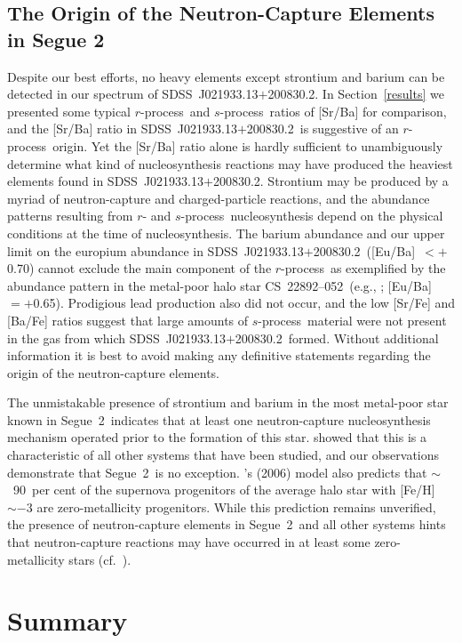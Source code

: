 \documentclass[useAMS,usenatbib,usegraphicx]{mn2e}
\def\rpro{\mbox{$r$-process}}
\def\spro{\mbox{$s$-process}}
\def\seg{\mbox{SDSS~J021933.13$+$200830.2}}
\def\seggal{\mbox{Segue~2}}
\def\cs{\mbox{CS~22892--052}}
\begin{document}
\subsection{The Origin of the Neutron-Capture Elements in Segue 2}
\label{ncaps}


Despite our best efforts, no heavy elements 
except strontium and barium
can be detected in our spectrum of \seg.
In Section~\ref{results}
we presented some typical \rpro\ and \spro\
ratios of [Sr/Ba] for comparison,
and the [Sr/Ba] ratio in \seg\ 
is suggestive of an \rpro\ origin.
Yet the [Sr/Ba] ratio alone is hardly sufficient to 
unambiguously determine what kind of
nucleosynthesis reactions may have produced the
heaviest elements found in \seg.
Strontium may be produced by a myriad of neutron-capture and
charged-particle reactions, and the abundance patterns
resulting from $r$- and \spro\
nucleosynthesis depend on the 
physical conditions at the time of nucleosynthesis.
The barium abundance and 
our upper limit on the europium abundance in \seg\
([Eu/Ba]~$< +$0.70)
cannot exclude the main component of the \rpro\
as exemplified by the abundance pattern in the
metal-poor halo star \cs\ (e.g., \citealt{sneden03};
[Eu/Ba]~$= +$0.65).
Prodigious lead production also did not occur,
and the low [Sr/Fe] and [Ba/Fe] ratios suggest 
that large amounts of \spro\ material were not present
in the gas from which \seg\ formed.
Without additional information it is best to avoid
making any definitive statements regarding the origin 
of the neutron-capture elements.

The unmistakable presence of strontium and barium
in the most metal-poor star known in \seggal\
indicates that at least one neutron-capture nucleosynthesis
mechanism operated prior to the formation of this star.
\citet{roederer13} showed that this is a characteristic of
all other systems that have been studied,
and our observations demonstrate that \seggal\ is no exception.
\citeauthor{tumlinson06}'s (2006) model also 
predicts that $\sim$~90~per cent of the supernova progenitors of
the average halo star with [Fe/H]~$\sim -$3
are zero-metallicity progenitors.  
While this prediction remains unverified,
the presence of neutron-capture elements in \seggal\ and 
all other systems 
hints that neutron-capture reactions may have occurred in
at least some zero-metallicity stars
(cf.\ \citealt{roederer14b}).


\section{Summary}
\label{summary}
\end{document}
